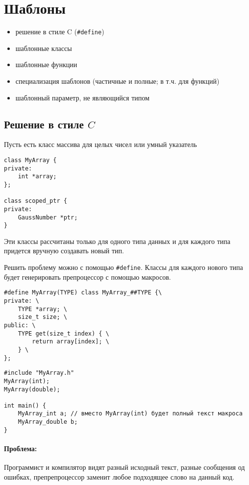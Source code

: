 \section{Шаблоны}
\begin{itemize}[noitemsep]
    \item решение в стиле C (\texttt{\#define})
    \item шаблонные классы
    \item шаблонные функции
    \item специализация шаблонов (частичные и полные; в т.ч. для функций)
    \item шаблонный параметр, не являющийся типом
\end{itemize}
\subsection{Решение в стиле $ C$}
Пусть есть класс массива для целых чисел или умный указатель
\begin{verbatim}
class MyArray {
private:
    int *array;
};

class scoped_ptr {
private:
    GaussNumber *ptr;
}
\end{verbatim}
Эти классы рассчитаны только для одного типа данных и для каждого типа придется вручную создавать новый тип.

Решить проблему можно с помощью \texttt{\#define}. Классы для каждого нового типа будет генерировать препроцессор с помощью макросов.
\begin{verbatim}
#define MyArray(TYPE) class MyArray_##TYPE {\
private: \
    TYPE *array; \
    size_t size; \
public: \
    TYPE get(size_t index) { \
        return array[index]; \
    } \
};
\end{verbatim}
\begin{verbatim}
#include "MyArray.h"
MyArray(int);
MyArray(double);

int main() {
    MyArray_int a; // вместо MyArray(int) будет полный текст макроса
    MyArray_double b;
}
\end{verbatim}
\paragraph{Проблема:}
Программист и компилятор видят разный исходный текст, разные сообщения од ошибках, препрепроцессор заменит любое подходящее слово на данный код.  

